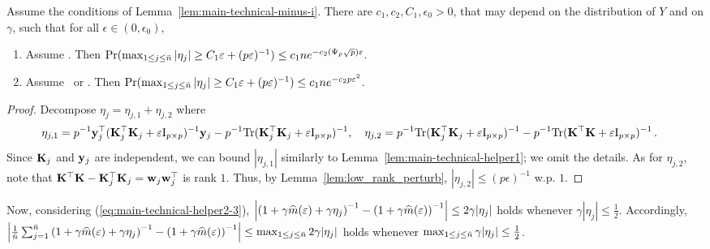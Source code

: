 \documentclass[times,sort&compress,3p]{elsarticle}
\begin{document}
\begin{lemma}\label{lem:main-technical-helper3}
    Assume the conditions of Lemma~\ref{lem:main-technical-minus-i}.
    There are $c_1,c_2,C_1,\epsilon_0>0$, that may depend on the distribution of $Y$ and on $\gamma$, such that for all $\epsilon\in (0,\epsilon_0)$,
    \begin{enumerate}
        \item Assume \AssumLC. Then $\Pr(\max_{1\le j\le \bar{n}}|\eta_j|\ge C_1\varepsilon + (p\varepsilon)^{-1}) \le c_1ne^{-c_2(\Psi_p\sqrt{p})\varepsilon}$.
        \item Assume \AssumIndep~or \AssumCCPSB. Then $\Pr(\max_{1\le j\le \bar{n}}|\eta_j|\ge C_1\varepsilon + (p\varepsilon)^{-1}) \le c_1ne^{-c_2p\varepsilon^2}$.
    \end{enumerate}
\end{lemma}
\begin{proof}
    Decompose $\eta_j=\eta_{j,1}+\eta_{j,2}$ where
    \begin{align*}
        &\eta_{j,1} =  p^{-1}{\bf y}_j^\top ({\bf K}_j^\top {\bf K}_j + \varepsilon\mathrm{I}_{p \times p})^{-1}{\bf y}_j - p^{-1}\textrm{Tr}({\bf K}_j^\top {\bf K}_j + \varepsilon\mathrm{I}_{p \times p})^{-1},
        \quad
        \eta_{j,2} = p^{-1}\textrm{Tr}({\bf K}_j^\top {\bf K}_j + \varepsilon\mathrm{I}_{p \times p})^{-1} - p^{-1}\textrm{Tr}({\bf K}^\top {\bf K} + \varepsilon\mathrm{I}_{p \times p})^{-1} \,.
    \end{align*}
    Since ${\bf K}_j$ and ${\bf y}_j$ are independent,
    we can bound $|\eta_{j,1}|$ similarly to Lemma~\ref{lem:main-technical-helper1}; we omit the details. As for $\eta_{j,2}$, note that ${\bf K}^\top {\bf K}-{\bf K}_j^\top {\bf K}_j={\bf w}_j{\bf w}_j^\top$ is rank $1$. Thus, by Lemma~\ref{lem:low_rank_perturb}, $|\eta_{j,2}|\le (p\epsilon)^{-1}$ w.p. $1$.
\end{proof}
Now, considering (\ref{eq:main-technical-helper2-3}), $\left|\left(1 + \gamma \widehat{m}(\varepsilon) + \gamma\eta_j \right)^{-1} - \left(1 + \gamma \widehat{m}(\varepsilon) \right)^{-1}\right| \le 2\gamma|\eta_j|$ holds whenever $\gamma|\eta_j|\le \frac12$.
Accordingly, $\left|\frac1{\bar{n}} \sum_{j=1}^{\bar{n}} \left(1 + \gamma \widehat{m}(\varepsilon) + \gamma\eta_j \right)^{-1}-\left(1 + \gamma \widehat{m}(\varepsilon) \right)^{-1}\right| \le \max_{1\le j \le \bar{n}}2\gamma|\eta_j|$ holds whenever ${\max_{1\le j\le \bar{n}}\gamma|\eta_j|\le \frac12}$.
\end{document}

